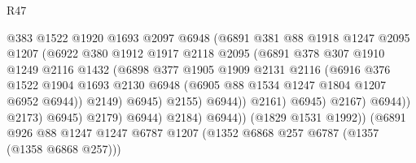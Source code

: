 \begin{lexlean}{R47}
\begin{coremodule}
                                    @383
                                    @1522
                                    @1920
                                    @1693
                                    @2097
                                    @6948
                                    (@6891
                                      @381
                                      @88
                                      @1918
                                      @1247
                                      @2095
                                      @1207
                                      (@6922
                                        @380
                                        @1912
                                        @1917
                                        @2118
                                        @2095
                                        (@6891
                                          @378
                                          @307
                                          @1910
                                          @1249
                                          @2116
                                          @1432
                                          (@6898
                                            @377
                                            @1905
                                            @1909
                                            @2131
                                            @2116
                                            (@6916
                                              @376
                                              @1522
                                              @1904
                                              @1693
                                              @2130
                                              @6948
                                              (@6905 @88 @1534 @1247 @1804 @1207 @6952 @6944))
                                            @2149)
                                          @6945)
                                        @2155)
                                      @6944))
                                  @2161)
                                @6945)
                              @2167)
                            @6944))
                        @2173)
                      @6945)
                    @2179)
                  @6944)
                @2184)
              @6944))
          (@1829 @1531 @1992))
        (@6891
          @926
          @88
          @1247
          @1247
          @6787
          @1207
          (@1352 @6868 @257 @6787 (@1357 (@1358 @6868 @257)))

\end{coremodule}
\end{lexlean}
